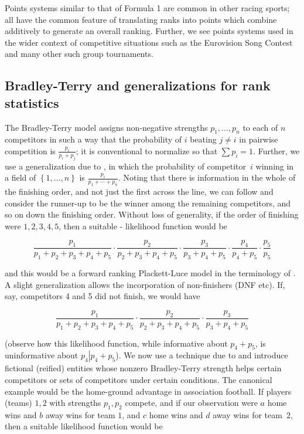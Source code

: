 \documentclass[a4,12pt]{article}
\begin{document}
Points systems similar to that of Formula 1 are common in other racing
sports; all have the common feature of translating ranks into points
which combine additively to generate an overall ranking.  Further, we
see points systems used in the wider context of competitive situations
such as the Eurovision Song Contest and many other such group
tournaments.

\subsection{Bradley-Terry and generalizations for rank
statistics}\label{bradley-terry-and-generalizations-for-rank-statistics}

The Bradley-Terry model \citep{bradley1952} assigns non-negative
strengths $p_1,\ldots, p_n$ to each of $n$ competitors in such a way
that the probability of $i$ beating $j\neq i$ in pairwise competition
is $\frac{p_i}{p_i+p_j}$; it is conventional to normalize so that
$\sum p_i=1$. Further, we use a generalization due to
\citet{luce1959}, in which the probability of competitor~$i$ winning
in a field of $\left\lbrace 1,\ldots, n\right\rbrace$ is
$\frac{p_i}{p_1+\cdots +p_n}$.  Noting that there is information in the
whole of the finishing order, and not just the first across the line,
we can follow \cite{plackett1975} and consider the runner-up to be the
winner among the remaining competitors, and so on down the finishing
order. Without loss of generality, if the order of finishing were
$1,2,3,4,5$, then a suitable
\citeauthor{plackett1975}-\citeauthor{luce1959} likelihood function
would be

\begin{equation}\label{competitors_1_to_5_likelihood}
\frac{p_1}{p_1+p_2+p_3+p_4+p_5}\cdot
\frac{p_2}{p_2+p_3+p_4+p_5}\cdot
\frac{p_3}{p_3+p_4+p_5}\cdot
\frac{p_4}{p_4+p_5}\cdot
\frac{p_5}{p_5}
\end{equation}

and this would be a forward ranking Plackett-Luce model in the
terminology of \cite{mollica2014}. A slight generalization allows the
incorporation of non-finishers (DNF etc). If, say, competitors 4 and 5
did not finish, we would have

\begin{equation}\label{competitors_1_to_3_only_finished}
\frac{p_1}{p_1+p_2+p_3+p_4+p_5}\cdot
\frac{p_2}{p_2+p_3+p_4+p_5}\cdot
\frac{p_3}{p_3+p_4+p_5}
\end{equation}

(observe how this likelihood function, while informative about
$p_4+p_5$, is uninformative about $p_4\left|p_4+p_5\right.$). We now
use a technique due to \cite{hankin2010,hankin2017} and introduce
fictional (reified) entities whose nonzero Bradley-Terry strength
helps certain competitors or sets of competitors under certain
conditions. The canonical example would be the home-ground advantage
in association football.  If players (teams) $1,2$ with strengths
$p_1,p_2$ compete, and if our observation were $a$ home wins and $b$
away wins for team $1$, and $c$ home wins and $d$ away wins for
team~$2$, then a suitable likelihood function would be
\end{document}
